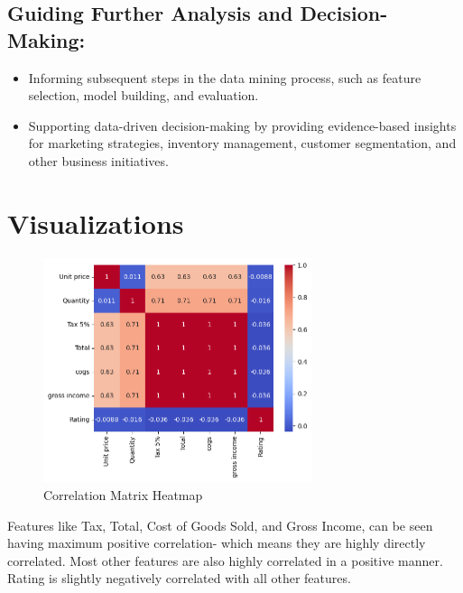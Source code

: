 \subsection{Guiding Further Analysis and Decision-Making:}
\begin{itemize}

\item Informing subsequent steps in the data mining process, such as feature selection, model building, and evaluation.
\item Supporting data-driven decision-making by providing evidence-based insights for marketing strategies, inventory management, customer segmentation, and other business initiatives.	

\end{itemize}

\section{Visualizations }

\begin{figure}[h]
    \centering
    \includegraphics[width=0.7\textwidth]{Chapters/ch3/ch_3_heatmap.png}
    \caption{Correlation Matrix Heatmap}
\end{figure}

Features like Tax, Total, Cost of Goods Sold, and Gross Income, can be seen having maximum positive correlation- which means they are highly directly correlated. Most other features are also highly correlated in a positive manner. Rating is slightly negatively correlated with all other features.

